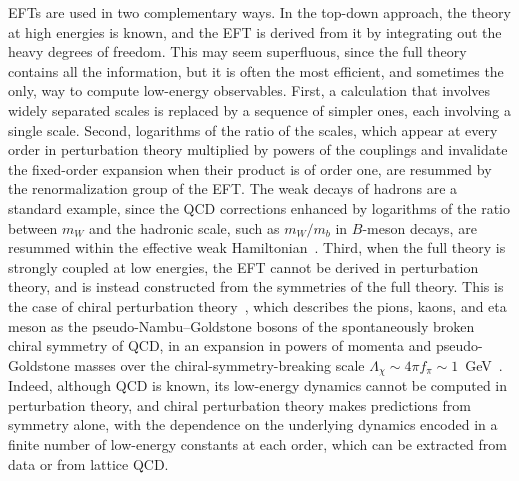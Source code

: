 EFTs are used in two complementary ways. In the top-down approach, the theory at high energies is
known, and the EFT is derived from it by integrating out the heavy degrees of freedom.
This may seem superfluous, since the full theory contains all the information, but it is often the
most efficient, and sometimes the only, way to compute low-energy observables. First, a calculation
that involves widely separated scales is replaced by a sequence of simpler ones, each involving a
single scale. Second, logarithms of the ratio of the scales, which appear at every order in
perturbation theory multiplied by powers of the couplings and invalidate the fixed-order expansion
when their product is of order one, are resummed by the renormalization group of the EFT. The weak
decays of hadrons are a standard example, since the QCD corrections enhanced by logarithms of the
ratio between $m_W$ and the hadronic scale, such as $m_W/m_b$ in $B$-meson decays, are resummed
within the effective weak Hamiltonian~\cite{Gaillard:1974nj,Altarelli:1974exa,Buchalla:1995vs}.
Third, when the full theory is strongly coupled at low energies, the EFT cannot be derived in
perturbation theory, and is instead constructed from the symmetries of the full theory. This is the
case of chiral perturbation theory~\cite{Weinberg:1978kz,Gasser:1983yg,Gasser:1984gg}, which
describes the pions, kaons, and eta meson as the pseudo-Nambu--Goldstone bosons of the spontaneously
broken chiral symmetry of QCD, in an expansion in powers of momenta and pseudo-Goldstone masses over
the chiral-symmetry-breaking scale $\Lambda_\chi\sim4\pi f_\pi\sim1$~GeV~\cite{Manohar:1983md}.
Indeed, although QCD is known, its low-energy dynamics cannot be computed in perturbation theory,
and chiral perturbation theory makes predictions from symmetry alone, with the dependence on the
underlying dynamics encoded in a finite number of low-energy constants at each order, which can be
extracted from data or from lattice QCD.

